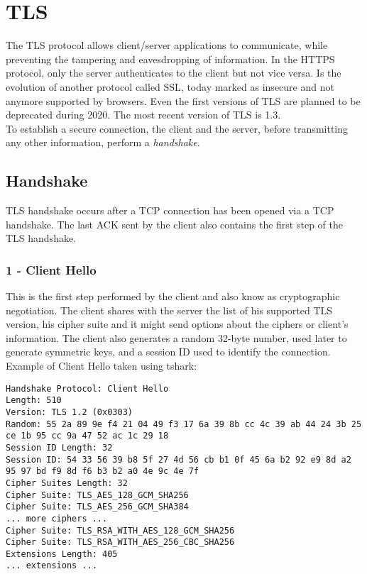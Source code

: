 \section{TLS}
The TLS protocol allows client/server applications to communicate, while preventing the tampering and eavesdropping of information. In the HTTPS protocol, only the server authenticates to the client but not vice versa. Is the evolution of another protocol called SSL, today marked as insecure and not anymore supported by browsers. Even the first versions of TLS are planned to be deprecated during 2020. The most recent version of TLS is 1.3.\\
To establish a secure connection, the client and the server, before transmitting any other information, perform a \emph{handshake}.
\subsection{Handshake}
TLS handshake occurs after a TCP connection has been opened via a TCP handshake. The last ACK sent by the client also contains the first step of the TLS handshake.
\subsubsection{1 - Client Hello}
This is the first step performed by the client and also know as cryptographic negotiation. The client shares with the server the list of his supported TLS version, his cipher suite and it might send options about the ciphers or client's information. The client also generates a random 32-byte number, used later to generate symmetric keys, and a session ID used to identify the connection.\\
Example of Client Hello taken using tshark:
\begin{lstlisting}
Handshake Protocol: Client Hello
Length: 510
Version: TLS 1.2 (0x0303)
Random: 55 2a 89 9e f4 21 04 49 f3 17 6a 39 8b cc 4c 39 ab 44 24 3b 25 ce 1b 95 cc 9a 47 52 ac 1c 29 18
Session ID Length: 32
Session ID: 54 33 56 39 b8 5f 27 4d 56 cb b1 0f 45 6a b2 92 e9 8d a2 95 97 bd f9 8d f6 b3 b2 a0 4e 9c 4e 7f
Cipher Suites Length: 32
Cipher Suite: TLS_AES_128_GCM_SHA256
Cipher Suite: TLS_AES_256_GCM_SHA384
... more ciphers ...
Cipher Suite: TLS_RSA_WITH_AES_128_GCM_SHA256
Cipher Suite: TLS_RSA_WITH_AES_256_CBC_SHA256
Extensions Length: 405
... extensions ...
\end{lstlisting}

